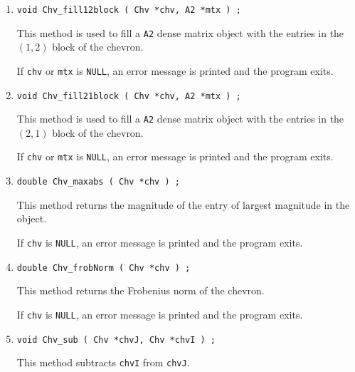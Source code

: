 \begin{enumerate}
\item
\begin{verbatim}
void Chv_fill12block ( Chv *chv, A2 *mtx ) ;
\end{verbatim}
This method is used to fill a {\tt A2} dense matrix object with
the entries in the $(1,2)$ block of the chevron.
\par {}
If {\tt chv} or {\tt mtx} is {\tt NULL},
an error message is printed and the program exits.
\item
\begin{verbatim}
void Chv_fill21block ( Chv *chv, A2 *mtx ) ;
\end{verbatim}
This method is used to fill a {\tt A2} dense matrix object with
the entries in the $(2,1)$ block of the chevron.
\par {}
If {\tt chv} or {\tt mtx} is {\tt NULL},
an error message is printed and the program exits.
\item
\begin{verbatim}
double Chv_maxabs ( Chv *chv ) ;
\end{verbatim}
This method returns the magnitude of the entry of largest magnitude
in the object.
\par {}
If {\tt chv} is {\tt NULL},
an error message is printed and the program exits.
\item
\begin{verbatim}
double Chv_frobNorm ( Chv *chv ) ;
\end{verbatim}
This method returns the Frobenius norm of the chevron.
\par {}
If {\tt chv} is {\tt NULL},
an error message is printed and the program exits.
\item
\begin{verbatim}
void Chv_sub ( Chv *chvJ, Chv *chvI ) ;
\end{verbatim}
This method subtracts {\tt chvI} from {\tt chvJ}.
\par {}

\end{enumerate}
